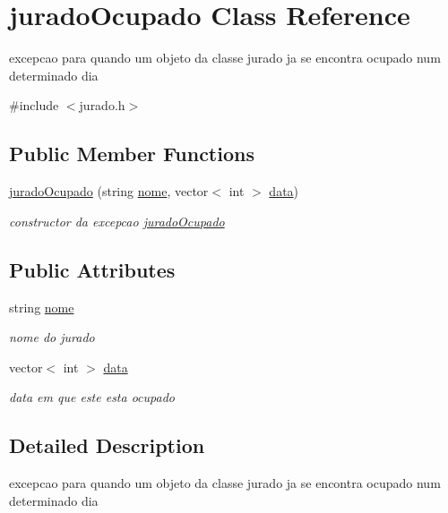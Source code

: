 \hypertarget{classjuradoOcupado}{}\section{jurado\+Ocupado Class Reference}
\label{classjuradoOcupado}


excepcao para quando um objeto da classe jurado ja se encontra ocupado num determinado dia  




{\ttfamily \#include $<$jurado.\+h$>$}

\subsection*{Public Member Functions}
\begin{DoxyCompactItemize}
\item 
\hyperlink{classjuradoOcupado_af6fa48b520c4cae1fa64edb9f590669e}{jurado\+Ocupado} (string \hyperlink{classjuradoOcupado_a38fa76168b435d63e7eb6294a644793e}{nome}, vector$<$ int $>$ \hyperlink{classjuradoOcupado_aceeab32c1cf0547045ba7166491d566a}{data})
\begin{DoxyCompactList}\small\item\em constructor da excepcao \hyperlink{classjuradoOcupado}{jurado\+Ocupado} \end{DoxyCompactList}\end{DoxyCompactItemize}
\subsection*{Public Attributes}
\begin{DoxyCompactItemize}
\item 
string \hyperlink{classjuradoOcupado_a38fa76168b435d63e7eb6294a644793e}{nome}
\begin{DoxyCompactList}\small\item\em nome do jurado \end{DoxyCompactList}\item 
vector$<$ int $>$ \hyperlink{classjuradoOcupado_aceeab32c1cf0547045ba7166491d566a}{data}
\begin{DoxyCompactList}\small\item\em data em que este esta ocupado \end{DoxyCompactList}\end{DoxyCompactItemize}


\subsection{Detailed Description}
excepcao para quando um objeto da classe jurado ja se encontra ocupado num determinado dia 

